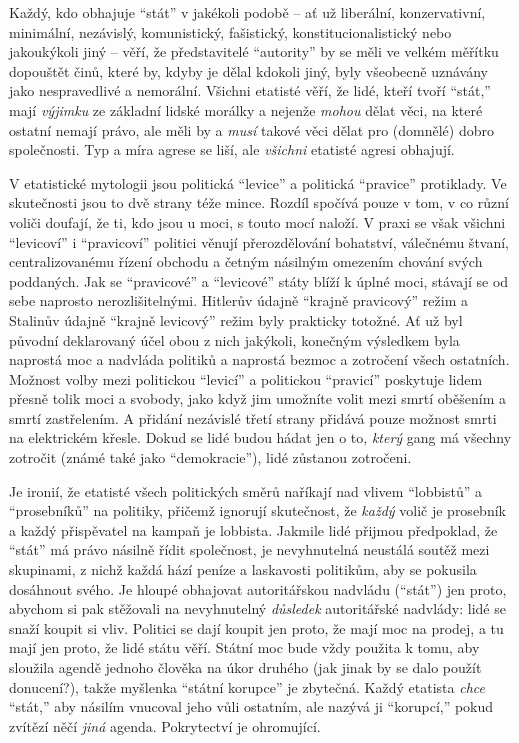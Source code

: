 \documentclass{book}
\begin{document}
Každý, kdo obhajuje \enquote{stát} v jakékoli podobě -- ať už liberální, konzervativní, minimální, nezávislý, komunistický, fašistický, konstitucionalistický nebo jakoukýkoli jiný -- věří, že představitelé \enquote{autority} by se měli ve velkém měřítku dopouštět činů, které by, kdyby je dělal kdokoli jiný, byly všeobecně uznávány jako nespravedlivé a nemorální. Všichni etatisté věří, že lidé, kteří tvoří \enquote{stát,} mají \emph{výjimku} ze základní lidské morálky a nejenže \emph{mohou} dělat věci, na které ostatní nemají právo, ale měli by a \emph{musí} takové věci dělat pro (domnělé) dobro společnosti. Typ a míra agrese se liší, ale \emph{všichni} etatisté agresi obhajují.

V etatistické mytologii jsou politická \enquote{levice} a politická \enquote{pravice} protiklady. Ve skutečnosti jsou to dvě strany téže mince. Rozdíl spočívá pouze v tom, v co různí voliči doufají, že ti, kdo jsou u moci, s touto mocí naloží. V praxi se však všichni \enquote{levicoví} i \enquote{pravicoví} politici věnují přerozdělování bohatství, válečnému štvaní, centralizovanému řízení obchodu a četným násilným omezením chování svých poddaných. Jak se \enquote{pravicové} a \enquote{levicové} státy blíží k úplné moci, stávají se od sebe naprosto nerozlišitelnými. Hitlerův údajně \enquote{krajně pravicový} režim a Stalinův údajně \enquote{krajně levicový} režim byly prakticky totožné. Ať už byl původní deklarovaný účel obou z nich jakýkoli, konečným výsledkem byla naprostá moc a nadvláda politiků a naprostá bezmoc a zotročení všech ostatních. Možnost volby mezi politickou \enquote{levicí} a politickou \enquote{pravicí} poskytuje lidem přesně tolik moci a svobody, jako když jim umožníte volit mezi smrtí oběšením a smrtí zastřelením. A přidání nezávislé třetí strany přidává pouze možnost smrti na elektrickém křesle. Dokud se lidé budou hádat jen o to, \emph{který} gang má všechny zotročit (známé také jako \enquote{demokracie}), lidé zůstanou zotročeni.

Je ironií, že etatisté všech politických směrů naříkají nad vlivem \enquote{lobbistů} a \enquote{prosebníků} na politiky, přičemž ignorují skutečnost, že \emph{každý} volič je prosebník a každý přispěvatel na kampaň je lobbista. Jakmile lidé přijmou předpoklad, že \enquote{stát} má právo násilně řídit společnost, je nevyhnutelná neustálá soutěž mezi skupinami, z nichž každá hází peníze a laskavosti politikům, aby se pokusila dosáhnout svého. Je hloupé obhajovat autoritářskou nadvládu (\enquote{stát}) jen proto, abychom si pak stěžovali na nevyhnutelný \emph{důsledek} autoritářské nadvlády: lidé se snaží koupit si vliv. Politici se dají koupit jen proto, že mají moc na prodej, a tu mají jen proto, že lidé státu věří. Státní moc bude vždy použita k tomu, aby sloužila agendě jednoho člověka na úkor druhého (jak jinak by se dalo použít donucení?), takže myšlenka \enquote{státní korupce} je zbytečná. Každý etatista \emph{chce} \enquote{stát,} aby násilím vnucoval jeho vůli ostatním, ale nazývá ji \enquote{korupcí,} pokud zvítězí něčí \emph{jiná} agenda. Pokrytectví je ohromující.
\end{document}
